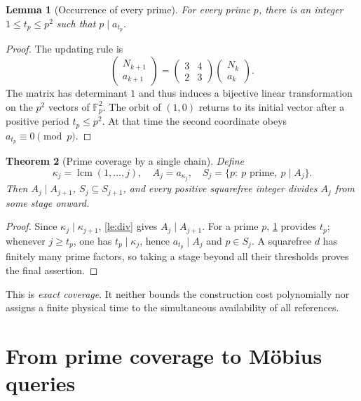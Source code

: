 \documentclass[11pt,a4paper]{article}
\theoremstyle{mine}
\newtheorem{theorem}{Theorem}[section]
\newtheorem{lemma}[theorem]{Lemma}
\theoremstyle{definition}
\begin{document}
\begin{lemma}[Occurrence of every prime]\label{le:orbit}
For every prime $p$, there is an integer $1\le t_p\le p^2$ such that $p\mid a_{t_p}$.
\end{lemma}
\begin{proof}
The updating rule is
\[
\begin{pmatrix}N_{k+1}\\a_{k+1}\end{pmatrix}
=\begin{pmatrix}3&4\\2&3\end{pmatrix}
\begin{pmatrix}N_k\\a_k\end{pmatrix}.
\]
The matrix has determinant $1$ and thus induces a bijective linear transformation on the $p^2$ vectors of $\mathbb F_p^2$. The orbit of $(1,0)$ returns to its initial vector after a positive period $t_p\le p^2$. At that time the second coordinate obeys $a_{t_p}\equiv0\pmod p$.
\end{proof}

\begin{theorem}[Prime coverage by a single chain]\label{th:coverage}
Define
\begin{equation}\label{eq:chain}
\kappa_j=\operatorname{lcm}(1,\ldots,j),\quad A_j=a_{\kappa_j},
\quad S_j=\{p:\ p\text{ prime},\ p\mid A_j\}.
\end{equation}
Then $A_j\mid A_{j+1}$, $S_j\subseteq S_{j+1}$, and every positive squarefree integer divides $A_j$ from some stage onward.
\end{theorem}
\begin{proof}
Since $\kappa_j\mid\kappa_{j+1}$, \cref{le:div} gives $A_j\mid A_{j+1}$. For a prime $p$, \cref{le:orbit} provides $t_p$; whenever $j\ge t_p$, one has $t_p\mid\kappa_j$, hence $a_{t_p}\mid A_j$ and $p\in S_j$. A squarefree $d$ has finitely many prime factors, so taking a stage beyond all their thresholds proves the final assertion.
\end{proof}

This is \emph{exact coverage}. It neither bounds the construction cost polynomially nor assigns a finite physical time to the simultaneous availability of all references.

\section{From prime coverage to M\"obius queries}
\end{document}
